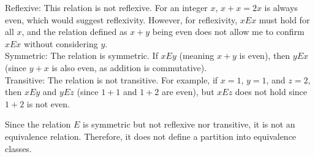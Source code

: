 \documentclass{amsart}
\theoremstyle{definition}
\theoremstyle{Exercise}
\theoremstyle{remark}
\theoremstyle{rule}
\numberwithin{equation}{section}
\begin{document}
\begin{enumerate}[label=(\alph*)]
Reflexive: This relation is not reflexive. For an integer \( x \), \( x + x = 2x \) is always even, which would suggest reflexivity. However, for reflexivity, \( xEx \) must hold for all \( x \), and the relation defined as \( x + y \) being even does not allow me to confirm \( xEx \) without considering \( y \).\\
Symmetric: The relation is symmetric. If \( xEy \) (meaning \( x + y \) is even), then \( yEx \) (since \( y + x \) is also even, as addition is commutative).\\
Transitive: The relation is not transitive. For example, if \( x = 1 \), \( y = 1 \), and \( z = 2 \), then \( xEy \) and \( yEz \) (since \( 1 + 1 \) and \( 1 + 2 \) are even), but \( xEz \) does not hold since \( 1 + 2 \) is not even.

Since the relation \( E \) is symmetric but not reflexive nor transitive, it is not an equivalence relation. Therefore, it does not define a partition into equivalence classes.
\\\\

\end{enumerate}
\end{document}
